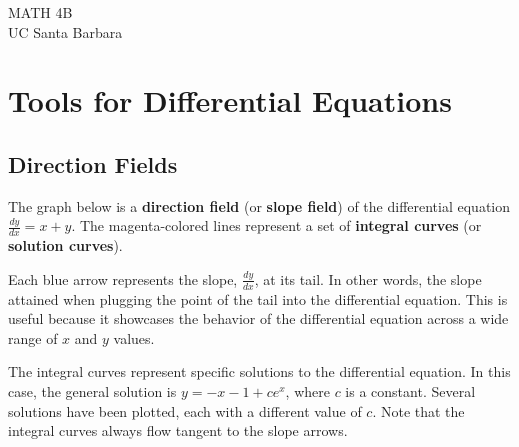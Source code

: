 

\maketitle

\begin{center}
	MATH 4B \\
	UC Santa Barbara \\
\end{center}

\section{Tools for Differential Equations}
\subsection{Direction Fields}
The graph below is a \textbf{direction field} (or \textbf{slope field}) of the differential equation $\frac{dy}{dx} = x + y$. The magenta-colored lines represent a set of \textbf{integral curves} (or \textbf{solution curves}).

Each blue arrow represents the slope, $\frac{dy}{dx}$, at its tail. In other words, the slope attained when plugging the point of the tail into the differential equation. This is useful because it showcases the behavior of the differential equation across a wide range of $x$ and $y$ values.

The integral curves represent specific solutions to the differential equation. In this case, the general solution is $y = -x - 1 + ce^x$, where $c$ is a constant. Several solutions have been plotted, each with a different value of $c$. Note that the integral curves always flow tangent to the slope arrows.

\begin{center}
\end{center}

